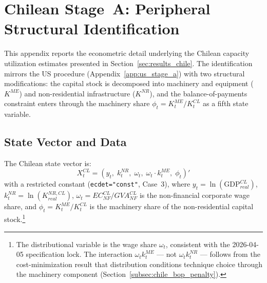 
\section{Chilean Stage~A: Peripheral Structural Identification}

This appendix reports the econometric detail underlying the Chilean
capacity utilization estimates presented in
Section~\ref{sec:results_chile}. The identification mirrors the US
procedure (Appendix~\ref{app:us_stage_a}) with two structural
modifications: the capital stock is decomposed into machinery and
equipment ($K^{ME}$) and non-residential infrastructure ($K^{NR}$),
and the balance-of-payments constraint enters through the machinery
share $\phi_t = K_t^{ME}/K_t^{CL}$ as a fifth state variable.


\subsection{State Vector and Data}
\label{app:cl:data}

The Chilean state vector is:
%
\begin{equation}
	X_t^{CL} = \left(y_t,\; k_t^{NR},\; \omega_t,\;
	\omega_t \cdot k_t^{ME},\; \phi_t\right)'
	\label{eq:cl:sa:state_vector}
\end{equation}
%
with a restricted constant (\texttt{ecdet="const"}, Case~3), where
$y_t = \ln(\text{GDP}^{CL}_{real})$,
$k_t^{NR} = \ln(K^{NR,CL}_{real})$,
$\omega_t = EC^{CL}_{NF}/GVA^{CL}_{NF}$ is the non-financial
corporate wage share, and $\phi_t = K_t^{ME}/K_t^{CL}$ is the
machinery share of the non-residential capital stock.\footnote{The
	distributional variable is the wage share $\omega_t$, consistent with
	the 2026-04-05 specification lock. The interaction $\omega_t k_t^{ME}$
	--- not $\omega_t k_t^{NR}$ --- follows from the cost-minimization
	result that distribution conditions technique choice through the
	machinery component (Section~\ref{subsec:chile_bop_penalty}).}


